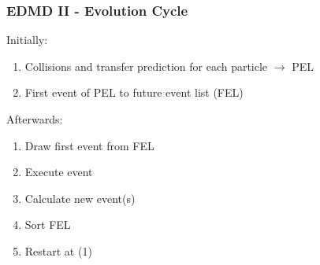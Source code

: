 \documentclass[smaller,notes=hide]{beamer}
\newlength{\wideitemsep}
\let\olditem\item
\renewcommand{\item}{\setlength{\itemsep}{\wideitemsep}\olditem}
\begin{document}
\begin{frame}
\frametitle{EDMD II - Evolution Cycle}
Initially:
\begin{enumerate}
\item Collisions and transfer prediction for each particle $\rightarrow$ PEL
\item First event of PEL to future event list (FEL)
\end{enumerate}
\vspace{0.5cm}

Afterwards:
\begin{enumerate}
\item Draw first event from FEL
\item Execute event
\item Calculate new event(s)
\item Sort FEL
\item Restart at (1)
\end{enumerate}
\end{frame}
\end{document}
